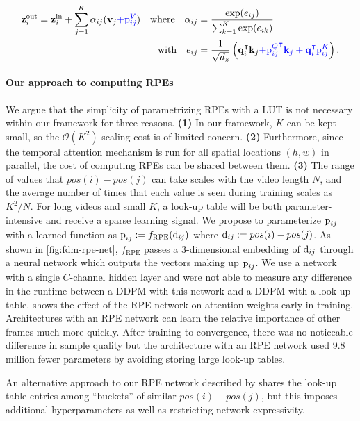 \begin{align}
    {\mathbf{z}}_i^\text{out} = {\mathbf{z}}^\text{in}_i + \sum_{j=1}^K \alpha_{ij}({\mathbf{v}}_j \textcolor{blue}{+ {\textnormal{p}}_{ij}^V}) \quad \text{where} \quad \alpha_{ij} &= \frac{\exp(e_{ij})}{\sum_{k=1}^K\exp(e_{ik})} \\
    \text{with} \quad e_{ij} &= \frac{1}{\sqrt{d_z}} \left( {\mathbf{q}}_i^\intercal {\mathbf{k}}_j \textcolor{blue}{+ {{\textnormal{p}}_{ij}^Q}^\intercal {\mathbf{k}}_j + {\mathbf{q}}_i^\intercal {{\textnormal{p}}_{ij}^K}} \right). \nonumber
\end{align}

\paragraph{Our approach to computing RPEs}
We argue that the simplicity of parametrizing RPEs with a LUT is not necessary within our framework for three reasons. 
\textbf{(1)} In our framework, $K$ can be kept small, so the $\mathcal{O}(K^2)$ scaling cost is of limited concern. 
\textbf{(2)} Furthermore, since the temporal attention mechanism is run for all spatial locations $(h, w)$ in parallel, the cost of computing RPEs can be shared between them.
\textbf{(3)} The range of values that $pos(i)-pos(j)$ can take scales with the video length $N$, and the average number of times that each value is seen during training scales as ${K^2/N}$. For long videos and small $K$, a look-up table will be both parameter-intensive and receive a sparse learning signal. 
%
We propose to parameterize ${\textnormal{p}}_{ij}$ with a learned function as ${{\textnormal{p}}_{ij} := f_\text{RPE}({\textnormal{d}}_{ij})}$ where ${\textnormal{d}}_{ij} := pos(i)-pos(j)$. As shown in \cref{fig:fdm-rpe-net}, $f_\text{RPE}$ passes a 3-dimensional embedding of ${\textnormal{d}}_{ij}$ through a neural network which outputs the vectors making up ${\textnormal{p}}_{ij}$. We use a network with a single $C$-channel hidden layer and were not able to measure any difference in the runtime between a DDPM with this network and a DDPM with a look-up table.   shows the effect of the RPE network on attention weights early in training. Architectures with an RPE network can learn the relative importance of other frames much more quickly. After training to convergence, there was no noticeable difference in sample quality but the architecture with an RPE network used 9.8 million fewer parameters by avoiding storing large look-up tables.

An alternative approach to our RPE network described by \citet{wu2021rethinking} shares the look-up table entries among ``buckets'' of similar $pos(i)-pos(j)$, but this imposes additional hyperparameters as well as restricting network expressivity.

